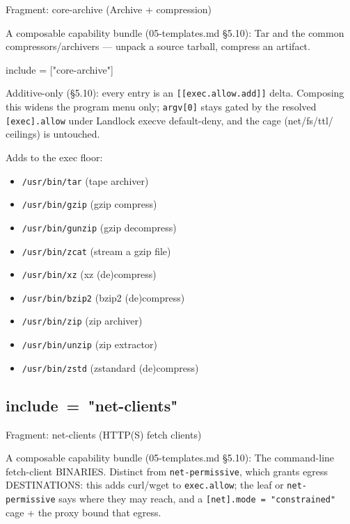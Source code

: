 Fragment: core-archive (Archive + compression)

A composable capability bundle (05-templates.md §5.10): Tar and the
common compressors/archivers --- unpack a source tarball, compress an
artifact.

\begin{kennelcode}
include = ["core-archive"]
\end{kennelcode}

Additive-only (§5.10): every entry is an
\texttt{{[}{[}exec.allow.add{]}{]}} delta. Composing this widens the
program menu only; \texttt{argv{[}0{]}} stays gated by the resolved
\texttt{{[}exec{]}.allow} under Landlock execve default-deny, and the
cage (net/fs/ttl/ ceilings) is untouched.

Adds to the exec floor:

\begin{itemize}
\tightlist
\item
  \texttt{/usr/bin/tar} (tape archiver)
\item
  \texttt{/usr/bin/gzip} (gzip compress)
\item
  \texttt{/usr/bin/gunzip} (gzip decompress)
\item
  \texttt{/usr/bin/zcat} (stream a gzip file)
\item
  \texttt{/usr/bin/xz} (xz (de)compress)
\item
  \texttt{/usr/bin/bzip2} (bzip2 (de)compress)
\item
  \texttt{/usr/bin/zip} (zip archiver)
\item
  \texttt{/usr/bin/unzip} (zip extractor)
\item
  \texttt{/usr/bin/zstd} (zstandard (de)compress)
\end{itemize}

\hypertarget{include-net-clients}{%
\subsection{\texorpdfstring{include\ =\ "net-clients"}{include = "net-clients"}}\label{include-net-clients}}

Fragment: net-clients (HTTP(S) fetch clients)

A composable capability bundle (05-templates.md §5.10): The command-line
fetch-client BINARIES. Distinct from \texttt{net-permissive}, which
grants egress DESTINATIONS: this adds curl/wget to \texttt{exec.allow};
the leaf or \texttt{net-permissive} says where they may reach, and a
\texttt{{[}net{]}.mode\ =\ "constrained"} cage + the proxy bound that
egress.

